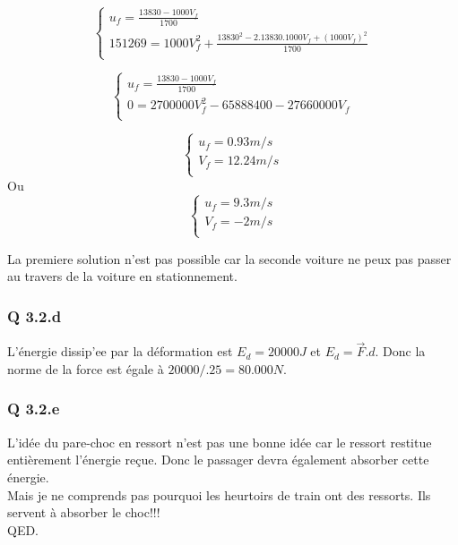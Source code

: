 \documentclass[]{book}
\theoremstyle{definition}
\begin{document}
$$
\left\{ 
\begin{array}{l}
 u_f = \frac{13830 - 1000V_f}{1700}\\
 151269  = 1000V_f^2 + \frac{13830^2 - 2.13830.1000V_f + (1000V_f)^2}{1700}\\
\end{array}
\right. 
$$

$$
\left\{ 
\begin{array}{l}
 u_f = \frac{13830 - 1000V_f}{1700}\\
 0 = 2700000V_f^2 -65888400 - 27660000V_f \\
\end{array}
\right. 
$$

$$
\left\{ 
\begin{array}{l}
 u_f = 0.93m/s\\
 V_f = 12.24m/s \\
\end{array}
\right. 
$$
Ou
$$
\left\{ 
\begin{array}{l}
 u_f = 9.3m/s\\
 V_f = -2m/s \\
\end{array}
\right. 
$$

La premiere solution n'est pas possible car la seconde voiture ne peux pas passer au travers de la voiture en stationnement.

\subsubsection*{Q 3.2.d}
L'\'energie dissip'ee par la d\'eformation est $E_d = 20000J$ et $E_d = \overrightarrow{F}.d$. Donc la norme de la force est \'egale \`a $20000/.25 = 80.000N$.

\subsubsection*{Q 3.2.e}
 L'id\'ee du pare-choc en ressort n'est pas une bonne id\'ee car le ressort restitue enti\`erement l'\'energie re\c{c}ue. Donc le passager devra \'egalement absorber cette \'energie.\\
 Mais je ne comprends pas pourquoi les heurtoirs de train ont des ressorts. Ils servent \`a absorber le choc!!!\\
 
 
 
QED.
\end{document}
